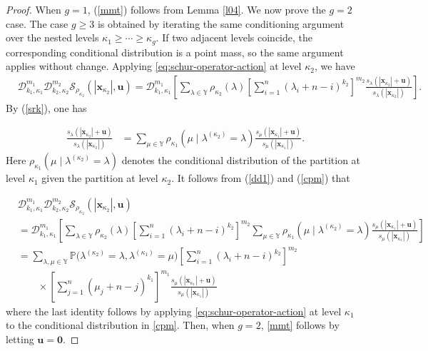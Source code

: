 \documentclass[11pt]{amsart}
\theoremstyle{plain}
\newcommand\YY{{\mathbb {Y}}}
\numberwithin{equation}{section}
\numberwithin{theorem}{section}
\numberwithin{figure}{section}
\begin{document}
 \begin{proof} When $g=1$, (\ref{mmt}) follows from Lemma \ref{l04}. We now prove the $g=2$ case. The case $g\geq3$ is obtained by iterating the same conditioning argument over the nested levels $\kappa_1\geq\cdots\geq\kappa_g$. If two adjacent levels coincide, the corresponding conditional distribution is a point mass, so the same argument applies without change. Applying \eqref{eq:schur-operator-action} at level $\kappa_2$, we have
\begin{align}
&\mathcal{D}_{k_1,\kappa_1}^{m_1}\mathcal{D}_{k_2,\kappa_2}^{m_2}\mathcal{S}_{\rho_{\kappa_2}}(|\mathbf{x}_{\kappa_2}|,\mathbf{u})=\mathcal{D}_{k_1,\kappa_1}^{m_1}\left[\sum_{\lambda\in \YY}\rho_{\kappa_2}(\lambda)
\left[\sum_{i=1}^n(\lambda_i+n-i)^{k_2}\right]^{m_2}\frac{s_{\lambda}(|\mathbf{x}_{\kappa_2}|+\mathbf{u})}{s_{\lambda}(|\mathbf{x}_{\kappa_2}|)}\right].\label{dd1}
 \end{align}
 By (\ref{srk}), one has
  
  \begin{align}
\frac{s_{\lambda}(|\mathbf{x}_{\kappa_2}|+\mathbf{u})}{s_{
\lambda}(|\mathbf{x}_{\kappa_2}|)}
&=\sum_{\mu\in \YY}\rho_{\kappa_1}(\mu\mid\lambda^{(\kappa_2)}=\lambda)\frac{s_{\mu}(|\mathbf{x}_{\kappa_1}|+\mathbf{u})}{s_{\mu}(|\mathbf{x}_{\kappa_1}|)}.\label{cpm}
\end{align} 
 Here $\rho_{\kappa_1}(\mu\mid\lambda^{(\kappa_2)}=\lambda)$ denotes the conditional distribution of the partition at level $\kappa_1$ given the partition at level $\kappa_2$.  It follows from (\ref{dd1}) and (\ref{cpm}) that
 
  \begin{align*}
&\mathcal{D}_{k_1,\kappa_1}^{m_1}\mathcal{D}_{k_2,\kappa_2}^{m_2}\mathcal{S}_{\rho_{\kappa_2}}(|\mathbf{x}_{\kappa_2}|,\mathbf{u})\\
&=\mathcal{D}_{k_1,\kappa_1}^{m_1}\left[\sum_{\lambda\in \YY}\rho_{\kappa_2}(\lambda)
\left[\sum_{i=1}^n(\lambda_i+n-i)^{k_2}\right]^{m_2}\sum_{\mu\in \YY}\rho_{\kappa_1}(\mu\mid\lambda^{(\kappa_2)}=\lambda)\frac{s_{\mu}(|\mathbf{x}_{\kappa_1}|+\mathbf{u})}{s_{\mu}(|\mathbf{x}_{\kappa_1}|)}\right]\\
&=\sum_{\lambda,\mu\in\YY}
\mathbb P\bigl(
    \lambda^{(\kappa_2)}=\lambda,
    \lambda^{(\kappa_1)}=\mu
\bigr)
\left[\sum_{i=1}^n(\lambda_i+n-i)^{k_2}\right]^{m_2}\\
&\qquad\times
\left[\sum_{j=1}^n(\mu_j+n-j)^{k_1}\right]^{m_1}
\frac{s_{\mu}(|\mathbf{x}_{\kappa_1}|+\mathbf{u})}
     {s_{\mu}(|\mathbf{x}_{\kappa_1}|)}
\end{align*} 
where the last identity follows by applying \eqref{eq:schur-operator-action} at level $\kappa_1$ to the conditional distribution in \eqref{cpm}. Then, when $g=2$, \eqref{mmt} follows by letting $\mathbf{u}=\mathbf{0}$.
 \end{proof}
\end{document}
